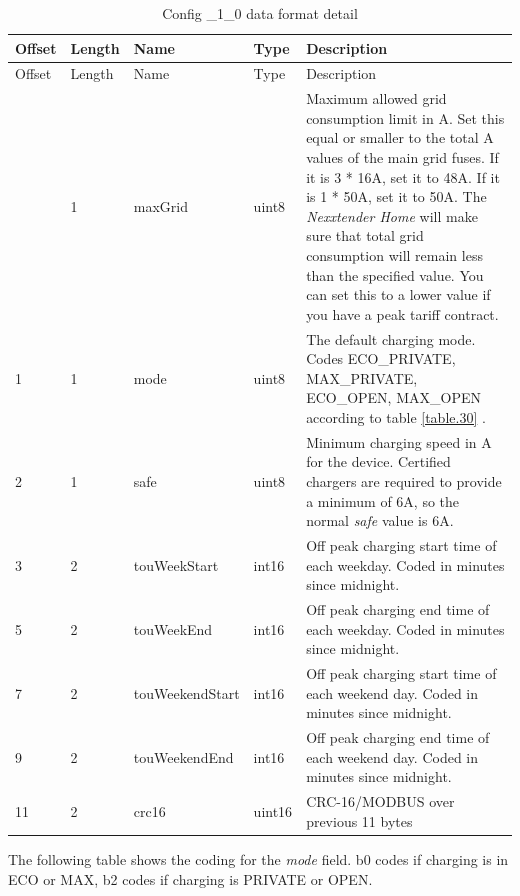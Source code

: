 \documentclass[a4paper]{article}
\newcommand{\secref}[1]{\ref{#1} \nameref{#1}}
\begin{document}
\begin{longtable}[]{@{}llllp{9.5cm}@{}}
	\caption{Config \_1\_0 data format detail}
	\label{table.31}
	\tabularnewline
	\toprule\noalign{}
	Offset & Length & Name            & Type   & Description                                    \\
	\midrule\noalign{}
	\endfirsthead
	\toprule\noalign{}
	Offset & Length & Name            & Type   & Description                                    \\
	\midrule\noalign{}
	\endhead
	\bottomrule\noalign{}
	\endlastfoot
	0      & 1      & maxGrid         & uint8  & Maximum allowed grid consumption limit in A.   
	Set this equal or smaller to the total A values of the main grid fuses.
	If it is 3 * 16A, set it to 48A. 
	If it is 1 * 50A, set it to 50A. 
	The \emph{Nexxtender Home} will make sure that total grid consumption will
	remain less than the specified value. 
	You can set this to a lower value	if you have a peak tariff contract. \\
	1      & 1      & mode            & uint8  & The default charging mode. Codes ECO\_PRIVATE, 
	MAX\_PRIVATE, ECO\_OPEN, MAX\_OPEN according to table
	\secref{table.30}. \\
	2      & 1      & safe            & uint8  & Minimum charging speed in A for the device.    
	Certified chargers are required to provide a minimum of 6A, 
	so the normal \emph{safe} value is 6A. \\
	3      & 2      & touWeekStart    & int16  & Off peak charging start time of each weekday. 
	Coded in minutes since midnight. \\
	5      & 2      & touWeekEnd      & int16  & Off peak charging end time of each weekday.    
	Coded in minutes since midnight. \\
	7      & 2      & touWeekendStart & int16  & Off peak charging start time of each weekend day. 
	Coded in minutes since midnight. \\
	9      & 2      & touWeekendEnd   & int16  & Off peak charging end time of each	weekend day. 
	Coded in minutes since midnight. \\
	11     & 2      & crc16           & uint16 & CRC-16/MODBUS over previous 11 bytes           \\
\end{longtable}

The following table shows the coding for the \emph{mode} field. 
b0 codes if charging is in ECO or MAX, b2 codes if charging is PRIVATE or OPEN.
\end{document}
